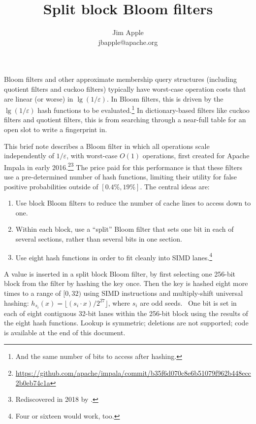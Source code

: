 \documentclass[letterpaper, 11pt]{article}
\begin{document}
\title{Split block Bloom filters}
\author{Jim Apple \\
  jbapple@apache.org}
\maketitle
\thispagestyle{empty}

Bloom filters and other approximate membership query structures (including quotient filters and cuckoo filters) typically have worst-case operation costs that are linear (or worse) in $\lg (1/\varepsilon)$. \cite{cuckoo-filter,quotient-filter}
In Bloom filters, this is driven by the $\lg (1/\varepsilon)$ hash functions to be evaluated.\footnote{And the same number of bits to access after hashing.}
In dictionary-based filters like cuckoo filters and quotient filters, this is from searching through a near-full table for an open slot to write a fingerprint in.

This brief note describes a Bloom filter in which all operations scale independently of $1/\varepsilon$, with worst-case $O(1)$ operations, first created for Apache Impala in early 2016.\footnote{\url{https://github.com/apache/impala/commit/b35f6d070c8e6b51079f962b448ecc2b0eb74c1a}}\footnote{Rediscovered in 2018 by \cite{ultra-fast}.}
The price paid for this performance is that these filters use a pre-determined number of hash functions, limiting their utility for false positive probabilities outside of $[0.4\%, 19\%]$.
The central ideas are:

\begin{enumerate}
\item Use block Bloom filters to reduce the number of cache lines to access down to one.~\cite{block}
\item Within each block, use a ``split'' Bloom filter that sets one bit in each of several sections, rather than several bits in one section.~\cite{split-bloom}
\item Use eight hash functions in order to fit cleanly into SIMD lanes.\footnote{Four or sixteen would work, too.}
\end{enumerate}

A value is inserted in a split block Bloom filter, by first selecting one 256-bit block from the filter by hashing the key once.
Then the key is hashed eight more times to a range of $[0,32)$ using SIMD instructions and multiply-shift universal hashing: $h_{s_i}(x) = \lfloor(s_i \cdot x) / 2^{27}\rfloor$, where $s_i$ are odd seeds.~\cite{multiply-shift}
One bit is set in each of eight contiguous 32-bit lanes within the 256-bit block using the results of the eight hash functions.
Lookup is symmetric; deletions are not supported; code is available at the end of this document.
\end{document}
